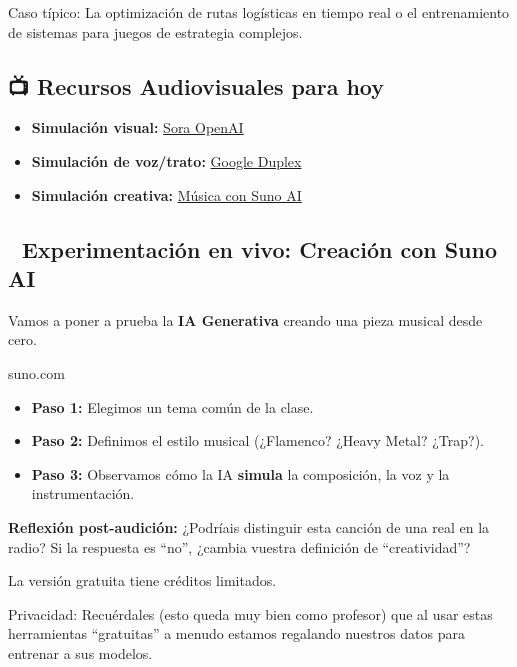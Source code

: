 \documentclass[
  spanish,
  letterpaper,
  DIV=11,
  numbers=noendperiod,
  oneside]{scrreprt}
\providecommand{\tightlist}{%
  \setlength{\itemsep}{0pt}\setlength{\parskip}{0pt}}
\begin{document}
Caso típico: La optimización de rutas logísticas en tiempo real o el
entrenamiento de sistemas para juegos de estrategia complejos.

\subsection{📺 Recursos Audiovisuales para
hoy}\label{recursos-audiovisuales-para-hoy}

\begin{itemize}
\tightlist
\item
  \textbf{Simulación visual:}
  \href{https://www.youtube.com/watch?v=HK6y8DAPN_0}{Sora OpenAI}
\item
  \textbf{Simulación de voz/trato:}
  \href{https://www.youtube.com/watch?v=D5VN56jQMWM}{Google Duplex}
\item
  \textbf{Simulación creativa:}
  \href{https://www.youtube.com/watch?v=2_W6S78Xf68}{Música con Suno AI}
\end{itemize}

\subsection{🎵 Experimentación en vivo: Creación con Suno
AI}\label{experimentaciuxf3n-en-vivo-creaciuxf3n-con-suno-ai}

Vamos a poner a prueba la \textbf{IA Generativa} creando una pieza
musical desde cero.

suno.com

\begin{itemize}
\tightlist
\item
  \textbf{Paso 1:} Elegimos un tema común de la clase.
\item
  \textbf{Paso 2:} Definimos el estilo musical (¿Flamenco? ¿Heavy Metal?
  ¿Trap?).
\item
  \textbf{Paso 3:} Observamos cómo la IA \textbf{simula} la composición,
  la voz y la instrumentación.
\end{itemize}

\textbf{Reflexión post-audición:} ¿Podríais distinguir esta canción de
una real en la radio? Si la respuesta es ``no'', ¿cambia vuestra
definición de ``creatividad''?

La versión gratuita tiene créditos limitados.

Privacidad: Recuérdales (esto queda muy bien como profesor) que al usar
estas herramientas ``gratuitas'' a menudo estamos regalando nuestros
datos para entrenar a sus modelos.
\end{document}
